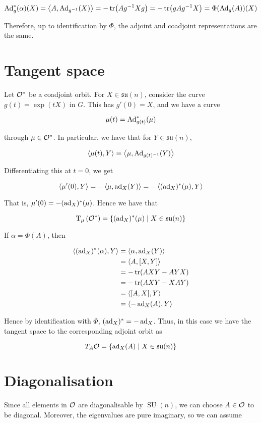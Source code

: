 \documentclass{article}
\DeclareMathOperator{\SU}{SU}
\newcommand{\su}{\mathfrak{su}}
\begin{document}
\[\operatorname{Ad}_g^*(\alpha)(X) = \left\langle A, \operatorname{Ad}_{g^{-1}}(X) \right\rangle = -\tr(Ag^{-1}Xg) = -\tr(gAg^{-1}X) = \Phi(\operatorname{Ad}_g(A))(X)\]

Therefore, up to identification by \(\Phi\), the adjoint and coadjoint representations are the same.

\section{Tangent space}

Let \(\mathcal{O}^*\) be a coadjoint orbit. For \(X \in \su(n)\), consider the curve \(g(t) = \exp(tX)\) in \(G\). This has \(g'(0) = X\), and we have a curve

\[\mu(t) = \operatorname{Ad}_{g(t)}^*(\mu)\]

through \(\mu \in \mathcal{O}^*\). In particular, we have that for \(Y \in \su(n)\),

\[\left\langle \mu(t), Y \right\rangle = \left\langle \mu, \operatorname{Ad}_{g(t)^{-1}}(Y) \right\rangle\]

Differentiating this at \(t = 0\), we get

\[\left\langle \mu'(0), Y \right\rangle = -\left\langle \mu, \operatorname{ad}_X(Y) \right\rangle = -\left\langle (\operatorname{ad}_X)^*(\mu), Y \right\rangle\]

That is, \(\mu'(0) = -(\operatorname{ad}_X)^*(\mu)\). Hence we have that

\[\T_\mu\left(\mcO^*\right) = \left\{(\ad_X)^*(\mu) \mid X \in \su(n)\right\}\]

If \(\alpha= \Phi(A)\), then

\begin{align*}
    \left\langle (\operatorname{ad}_X)^*(\alpha), Y \right\rangle &= \left\langle \alpha, \operatorname{ad}_X(Y) \right\rangle \\
    &= \left\langle A, [X, Y] \right\rangle \\
    &= -\tr(AXY - AYX) \\
    &= -\tr(AXY - XAY) \\
    &= \left\langle [A, X], Y \right\rangle \\
    &= \left\langle -\operatorname{ad}_X(A), Y \right\rangle
\end{align*}

Hence by identification with \(\Phi\), \((\operatorname{ad}_X)^* = -\operatorname{ad}_X\). Thus, in this case we have the tangent space to the corresponding adjoint orbit as

\[T_A\mcO = \left\{\ad_X(A) \mid X \in \su(n)\right\}\]

\section{Diagonalisation}

Since all elements in \(\mathcal{O}\) are diagonalisable by \(\SU(n)\), we can choose \(A \in \mathcal{O}\) to be diagonal. Moreover, the eigenvalues are pure imaginary, so we can assume
\end{document}
